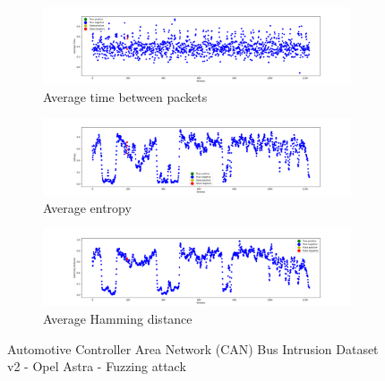 \begin{figure}
    \centering
    \begin{subfigure}[b]{\linewidth}
        \includegraphics[width = \linewidth]{img/parts/app/tests/tue/OpelAstra/fuzzing/AvgTime.png}
        \caption{Average time between packets}
        \label{subfig:extract_tue_opelastra_fuzzing_avgtime}
    \end{subfigure}
    \begin{subfigure}[b]{\linewidth}
        \includegraphics[width = \linewidth]{img/parts/app/tests/tue/OpelAstra/fuzzing/Entropy.png}
        \caption{Average entropy}
        \label{subfig:extract_tue_opelastra_fuzzing_entropy}
    \end{subfigure}
    \begin{subfigure}[b]{\linewidth}
        \includegraphics[width = \linewidth]{img/parts/app/tests/tue/OpelAstra/fuzzing/HammingDist.png}
        \caption{Average Hamming distance}
        \label{subfig:extract_tue_opelastra_fuzzing_hammingdist}
    \end{subfigure}
    \caption{Automotive Controller Area Network (CAN) Bus Intrusion Dataset v2 - Opel Astra - Fuzzing attack}
    \label{fig:extract_tue_opelastra_fuzzing}
\end{figure}


